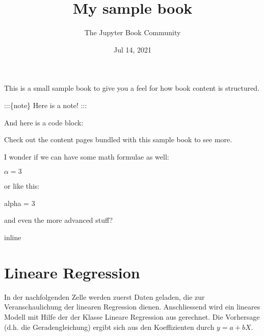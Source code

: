 \documentclass[letterpaper,10pt,english]{jupyterBook}
\title{My sample book}
\date{Jul 14, 2021}
\author{The Jupyter Book Community}
\begin{document}
\pagestyle{empty}
\sphinxmaketitle
\pagestyle{plain}
\sphinxtableofcontents
\pagestyle{normal}
\label{\detokenize{intro::doc}}


\sphinxAtStartPar
This is a small sample book to give you a feel for how book content is
structured.

\sphinxAtStartPar
:::\{note\}
Here is a note!
:::

\sphinxAtStartPar
And here is a code block:

\begin{sphinxVerbatim}[commandchars=\\\{\}]
  
\end{sphinxVerbatim}

\sphinxAtStartPar
Check out the content pages bundled with this sample book to see more.

\sphinxAtStartPar
I wonder if we can have some math formulae as well:

\sphinxAtStartPar
\(\alpha = 3\)

\sphinxAtStartPar
or like this:

\begin{sphinxVerbatim}[commandchars=\\\{\}]
\PYGZdl{}\PYGZbs{}alpha = 3\PYGZdl{}
\end{sphinxVerbatim}

\sphinxAtStartPar
and even the more advanced stuff?

\begin{sphinxVerbatim}[commandchars=\\\{\}]
   
 inline
\end{sphinxVerbatim}


\chapter{Lineare Regression}
\label{\detokenize{Regression_Techniques:lineare-regression}}\label{\detokenize{Regression_Techniques::doc}}
\sphinxAtStartPar
In der nachfolgenden Zelle werden zuerst Daten geladen, die zur Veranschaulichung der linearen Regression dienen.
Anschliessend wird ein lineares Modell mit Hilfe der der Klasse Lineare Regression aus  gerechnet. Die Vorhersage (d.h. die Geradengleichung) ergibt sich aus den Koeffizienten durch \(y = a + bX\).
\end{document}
